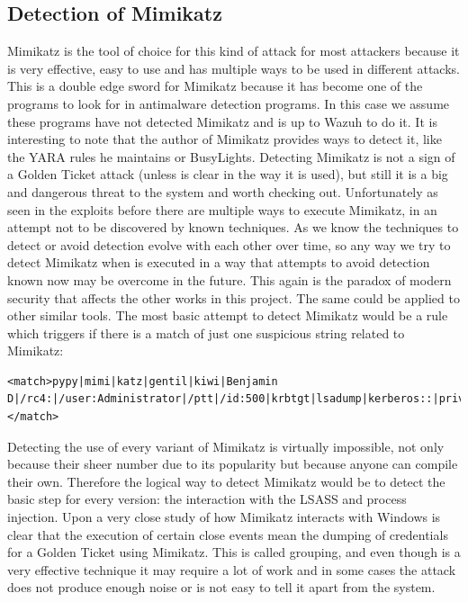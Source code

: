 \subsection{Detection of Mimikatz}
Mimikatz is the tool of choice for this kind of attack for most attackers because it is very effective, easy to use and has multiple ways to be used in different attacks\cite{mimikatz_github}\cite{mimikatz_details}. This is a double edge sword for Mimikatz because it has become one of the programs to look for in antimalware detection programs. In this case we assume these programs have not detected Mimikatz and is up to Wazuh to do it. It is interesting to note that the author of Mimikatz provides ways to detect it, like the YARA rules he maintains\cite{mimikatz_github} or BusyLights\cite{understanding_powersploit_mimikatz}.
\linej
\linej
Detecting Mimikatz is not a sign of a Golden Ticket attack (unless is clear in the way it is used), but still it is a big and dangerous threat to the system and worth checking out.
\linej
Unfortunately as seen in the exploits before there are multiple ways to execute Mimikatz, in an attempt not to be discovered by known techniques. As we know the techniques to detect or avoid detection evolve with each other over time, so any way we try to detect Mimikatz when is executed in a way that attempts to avoid detection known now may be overcome in the future. This again is the paradox of modern security that affects the other works in this project. The same could be applied to other similar tools.
\linej
\linej
The most basic attempt to detect Mimikatz would be a rule which triggers if there is a match of just one suspicious string related to Mimikatz:
\begin{lstlisting}[style=xml,numbers=none]
<match>pypy|mimi|katz|gentil|kiwi|Benjamin D|/rc4:|/user:Administrator|/ptt|/id:500|krbtgt|lsadump|kerberos::|privilege::</match>
\end{lstlisting}
\linej
Detecting the use of every variant of Mimikatz is virtually impossible, not only because their sheer number due to its popularity but because anyone can compile their own. Therefore the logical way to detect Mimikatz would be to detect the basic step for every version: the interaction with the LSASS and process injection\cite{understanding_powersploit_mimikatz}.
\linej
\linej
Upon a very close study of how Mimikatz interacts with Windows is clear that the execution of certain close events mean the dumping of credentials for a Golden Ticket using Mimikatz. This is called grouping, and even though is a very effective technique it may require a lot of work and in some cases the attack does not produce enough noise or is not easy to tell it apart from the system.

